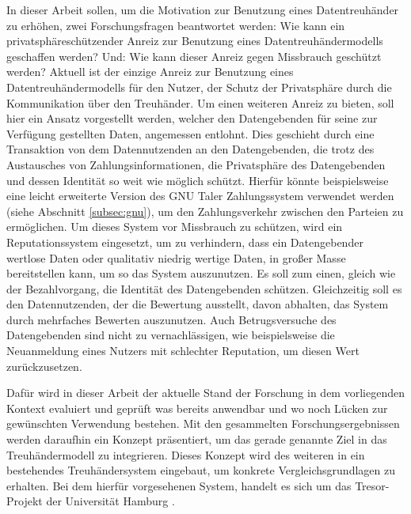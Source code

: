 \documentclass{scrreprt}
\begin{document}
In dieser Arbeit sollen, um die Motivation zur Benutzung eines Datentreuhänder zu erhöhen, zwei Forschungsfragen beantwortet werden: Wie kann ein privatsphäreschützender Anreiz zur Benutzung eines Datentreuhändermodells geschaffen werden? Und: Wie kann dieser Anreiz gegen Missbrauch geschützt werden? Aktuell ist der einzige Anreiz zur Benutzung eines Datentreuhändermodells für den Nutzer, der Schutz der Privatsphäre durch die Kommunikation über den Treuhänder. Um einen weiteren Anreiz zu bieten, soll hier ein Ansatz vorgestellt werden, welcher den Datengebenden für seine zur Verfügung gestellten Daten, angemessen entlohnt. Dies geschieht durch eine Transaktion von dem Datennutzenden an den Datengebenden, die trotz des Austausches von Zahlungsinformationen, die Privatsphäre des Datengebenden und dessen Identität so weit wie möglich schützt. Hierfür könnte beispielsweise eine leicht erweiterte Version des GNU Taler Zahlungssystem verwendet werden (siehe Abschnitt \ref{subsec:gnu}), um den Zahlungsverkehr zwischen den Parteien zu ermöglichen. Um dieses System vor Missbrauch zu schützen, wird ein Reputationssystem eingesetzt, um zu verhindern, dass ein Datengebender wertlose Daten oder qualitativ niedrig wertige Daten, in großer Masse bereitstellen kann, um so das System auszunutzen. Es soll zum einen, gleich wie der Bezahlvorgang, die Identität des Datengebenden schützen. Gleichzeitig soll es den Datennutzenden, der die Bewertung ausstellt, davon abhalten, das System durch mehrfaches Bewerten auszunutzen. Auch Betrugsversuche des Datengebenden sind nicht zu vernachlässigen, wie beispielsweise die Neuanmeldung eines Nutzers mit schlechter Reputation, um diesen Wert zurückzusetzen.

Dafür wird in dieser Arbeit der aktuelle Stand der Forschung in dem vorliegenden Kontext evaluiert und geprüft was bereits anwendbar und wo noch Lücken zur gewünschten Verwendung bestehen. Mit den gesammelten Forschungsergebnissen werden daraufhin ein Konzept präsentiert, um das gerade genannte Ziel in das Treuhändermodell zu integrieren. Dieses Konzept wird des weiteren in ein bestehendes Treuhändersystem eingebaut, um konkrete Vergleichsgrundlagen zu erhalten. Bei dem hierfür vorgesehenen System, handelt es sich um das Tresor-Projekt der Universität Hamburg \cite{TRESOR}.


\end{document}
